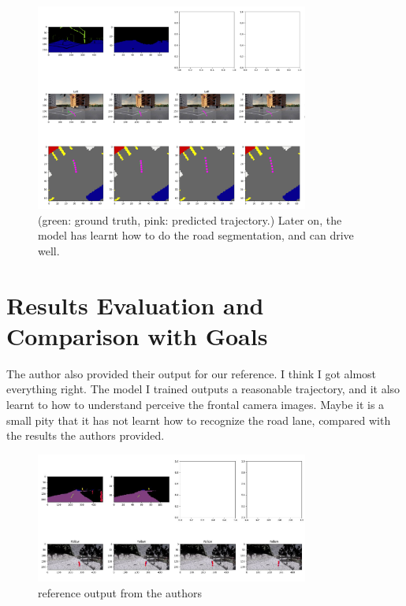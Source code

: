 \documentclass[inputenc=utf8]{ldvarticle}
\begin{document}
\begin{figure}[H]
  \centering
  \includegraphics[width=0.8\textwidth] {bilder/northern_pyramid_683.png} 
  \caption{(green: ground truth, pink: predicted trajectory.) Later on, the model has learnt how to do the road segmentation, and can drive well.}
\end{figure}

\section {Results Evaluation and Comparison with Goals}
The author also provided their output for our reference. I think I got almost everything right. The model I trained outputs a reasonable trajectory, and it also learnt to how to understand perceive the frontal camera images. Maybe it is a small pity that it has not learnt how to recognize the road lane, compared with the results the authors provided.
\begin{figure}[H]
  \centering
  \includegraphics[width=0.8\textwidth] {bilder/lbc.jpg} 
  \caption{reference output from the authors}
\end{figure}
\end{document}
